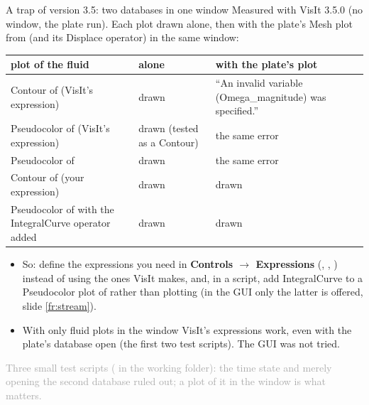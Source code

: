 \documentclass[aspectratio=169,11pt]{beamer}
\newcommand{\sourcecredit}[1]{\vfill\begin{flushright}\tiny\textcolor{DarkGray}{#1}\end{flushright}}
\newcommand{\gui}[1]{\textsf{\textbf{#1}}}
\begin{document}
\begin{frame}{A trap of version 3.5: two databases in one window}
\label{fr:twodb}
\scriptsize
Measured with VisIt 3.5.0 (no window, the plate run). Each plot drawn alone, then with the plate's Mesh plot from  (and its Displace operator) in the same window:
\begin{center}
\begin{tabular}{@{}L{0.42\textwidth}L{0.1\textwidth}L{0.4\textwidth}@{}}
\toprule
plot of the fluid & alone & with the plate's plot \\
\midrule
Contour of  (VisIt's expression) & drawn & ``An invalid variable (Omega\_magnitude) was specified.'' \\
Pseudocolor of  (VisIt's expression) & drawn (tested as a Contour) & the same error \\
Pseudocolor of  & drawn & the same error \\
Contour of  (your expression) & drawn & drawn \\
Pseudocolor of  with the IntegralCurve operator added & drawn & drawn \\
\bottomrule
\end{tabular}
\end{center}
\footnotesize
\begin{itemize}
  \item So: define the expressions you need in \gui{Controls $\to$ Expressions} (, , ) instead of using the ones VisIt makes, and, in a script, add IntegralCurve to a Pseudocolor plot of  rather than plotting  (in the GUI only the latter is offered, slide \ref{fr:stream}).
  \item With only fluid plots in the window VisIt's expressions work, even with the plate's database open (the first two test scripts). The GUI was not tried.
\end{itemize}
\sourcecredit{Three small test scripts (\code{wsl/final/visit\_ch27\_debug*.sh} in the working folder): the time state and merely opening the second database ruled out; a plot of it in the window is what matters.}
\end{frame}
\end{document}
